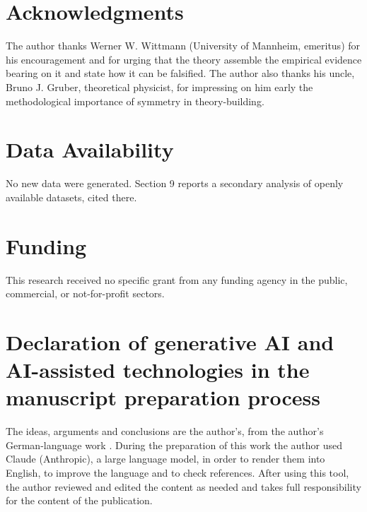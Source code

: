 \documentclass[12pt]{article}
\begin{document}
\section*{Acknowledgments}


The author thanks Werner W. Wittmann (University of Mannheim, emeritus) for his encouragement and for urging that the theory assemble the empirical evidence bearing on it and state how it can be falsified. The author also thanks his uncle, Bruno J. Gruber, theoretical physicist, for impressing on him early the methodological importance of symmetry in theory-building.

\section*{Data Availability}


No new data were generated. Section 9 reports a secondary analysis of openly available datasets, cited there.

\section*{Funding}


This research received no specific grant from any funding agency in the public, commercial, or not-for-profit sectors.

\section*{Declaration of generative AI and AI-assisted technologies in the manuscript preparation process}


The ideas, arguments and conclusions are the author's, from the author's German-language work \citep{Gruber2015}. During the preparation of this work the author used Claude (Anthropic), a large language model, in order to render them into English, to improve the language and to check references. After using this tool, the author reviewed and edited the content as needed and takes full responsibility for the content of the publication.




\end{document}
